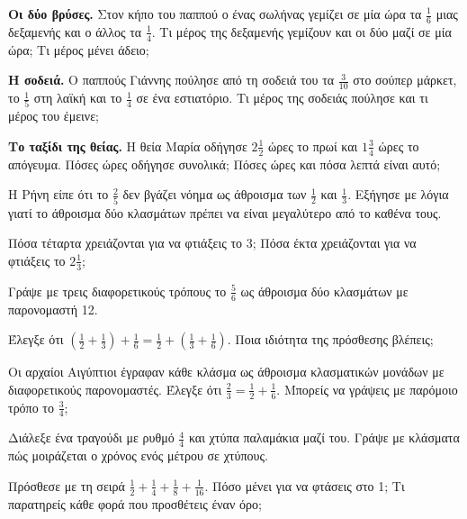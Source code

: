 \ex \textbf{Οι δύο βρύσες.} Στον κήπο του παππού ο ένας σωλήνας γεμίζει σε μία ώρα τα $\frac{1}{6}$ μιας δεξαμενής και ο άλλος τα $\frac{1}{4}$. Τι μέρος της δεξαμενής γεμίζουν και οι δύο μαζί σε μία ώρα; Τι μέρος μένει άδειο;

\ex \textbf{Η σοδειά.} Ο παππούς Γιάννης πούλησε από τη σοδειά του τα $\frac{3}{10}$ στο σούπερ μάρκετ, το $\frac{1}{5}$ στη λαϊκή και το $\frac{1}{4}$ σε ένα εστιατόριο. Τι μέρος της σοδειάς πούλησε και τι μέρος του έμεινε;

\ex \textbf{Το ταξίδι της θείας.} Η θεία Μαρία οδήγησε $2\frac{1}{2}$ ώρες το πρωί και $1\frac{3}{4}$ ώρες το απόγευμα. Πόσες ώρες οδήγησε συνολικά; Πόσες ώρες και πόσα λεπτά είναι αυτό;


\ex Η Ρήνη είπε ότι το $\frac{2}{5}$ δεν βγάζει νόημα ως άθροισμα των $\frac{1}{2}$ και $\frac{1}{3}$. Εξήγησε με λόγια γιατί το άθροισμα δύο κλασμάτων πρέπει να είναι μεγαλύτερο από το καθένα τους.

\ex Πόσα τέταρτα χρειάζονται για να φτιάξεις το 3; Πόσα έκτα χρειάζονται για να φτιάξεις το $2\frac{1}{3}$;

\ex Γράψε με τρεις διαφορετικούς τρόπους το $\frac{5}{6}$ ως άθροισμα δύο κλασμάτων με παρονομαστή 12.

\ex Έλεγξε ότι $\left(\frac{1}{2}+\frac{1}{3}\right)+\frac{1}{6}=\frac{1}{2}+\left(\frac{1}{3}+\frac{1}{6}\right)$. Ποια ιδιότητα της πρόσθεσης βλέπεις;

\ex Οι αρχαίοι Αιγύπτιοι έγραφαν κάθε κλάσμα ως άθροισμα κλασματικών μονάδων με διαφορετικούς παρονομαστές. Έλεγξε ότι $\frac{2}{3}=\frac{1}{2}+\frac{1}{6}$. Μπορείς να γράψεις με παρόμοιο τρόπο το $\frac{3}{4}$;


\ex Διάλεξε ένα τραγούδι με ρυθμό $\frac{4}{4}$ και χτύπα παλαμάκια μαζί του. Γράψε με κλάσματα πώς μοιράζεται ο χρόνος ενός μέτρου σε χτύπους.

\ex Πρόσθεσε με τη σειρά $\frac{1}{2}+\frac{1}{4}+\frac{1}{8}+\frac{1}{16}$. Πόσο μένει για να φτάσεις στο 1; Τι παρατηρείς κάθε φορά που προσθέτεις έναν όρο;
